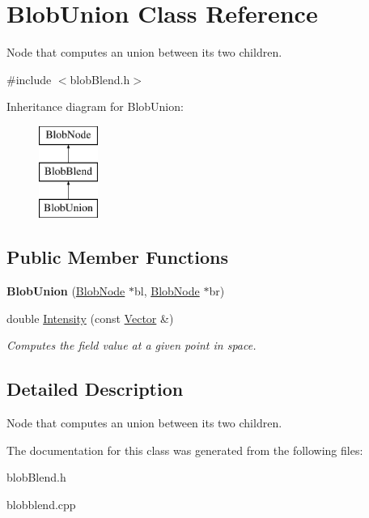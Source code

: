 \hypertarget{class_blob_union}{
\section{BlobUnion Class Reference}
\label{class_blob_union}
}


Node that computes an union between its two children.  




{\ttfamily \#include $<$blobBlend.h$>$}

Inheritance diagram for BlobUnion:\begin{figure}[H]
\begin{center}
\leavevmode
\includegraphics[height=3.000000cm]{class_blob_union}
\end{center}
\end{figure}
\subsection*{Public Member Functions}
\begin{DoxyCompactItemize}
\item 
\hypertarget{class_blob_union_af8456f9617f1fa9a85fe357f7d1f31f7}{
{\bfseries BlobUnion} (\hyperlink{class_blob_node}{BlobNode} $\ast$bl, \hyperlink{class_blob_node}{BlobNode} $\ast$br)}
\label{class_blob_union_af8456f9617f1fa9a85fe357f7d1f31f7}

\item 
\hypertarget{class_blob_union_a451c4255223f29217272200a67a2326d}{
double \hyperlink{class_blob_union_a451c4255223f29217272200a67a2326d}{Intensity} (const \hyperlink{class_vector}{Vector} \&)}
\label{class_blob_union_a451c4255223f29217272200a67a2326d}

\begin{DoxyCompactList}\small\item\em Computes the field value at a given point in space. \item\end{DoxyCompactList}\end{DoxyCompactItemize}


\subsection{Detailed Description}
Node that computes an union between its two children. 

The documentation for this class was generated from the following files:\begin{DoxyCompactItemize}
\item 
blobBlend.h\item 
blobblend.cpp\end{DoxyCompactItemize}
